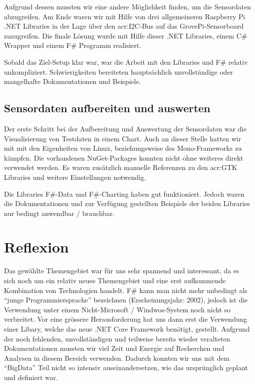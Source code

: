 Aufgrund dessen mussten wir eine andere Möglichkeit finden, um die Sensordaten abzugreifen. Am Ende waren wir mit Hilfe von drei allgemeineren Raspberry Pi .NET Libraries in der Lage über den \gls{acr:I2C}-Bus auf das GrovePi-Sensorboard zuzugreifen. Die finale Lösung wurde mit Hilfe dieser .NET Libraries, einem C\# Wrapper und einem F\# Programm realisiert.

Sobald das Ziel-Setup klar war, war die Arbeit mit den Libraries und F\# relativ unkompliziert. Schwierigkeiten bereiteten hauptsächlich unvollständige oder mangelhafte Dokumentationen und Beispiele.

\subsection{Sensordaten aufbereiten und auswerten}
Der erste Schritt bei der Aufbereitung und Auswertung der Sensordaten war die Visualisierung von Testdaten in einem Chart. Auch an dieser Stelle hatten wir mit mit den Eigenheiten von Linux, beziehungsweise des Mono-Frameworks zu kämpfen. Die vorhandenen NuGet-Packages konnten nicht ohne weiteres direkt verwendet werden. Es waren zusätzlich manuelle Referenzen zu den \gls{acr:GTK} Libraries und weitere Einstellungen notwendig. 

Die Libraries F\#-Data und F\#-Charting haben gut funktioniert. Jedoch waren die Dokumentationen und zur Verfügung gestellten Beispiele der beiden Libraries nur bedingt anwendbar / brauchbar.


\section{Reflexion}
Das gewählte Themengebiet war für uns sehr spannend und interessant, da es sich noch um ein relativ neues Themengebiet und eine erst aufkommende Kombination von Technologien handelt. F\# kann man nicht mehr unbedingt als "`junge Programmiersprache"' bezeichnen (Erscheinungsjahr: 2002), jedoch ist die Verwendung unter einem Nicht-Microsoft / Windwos-System noch nicht so verbreitet. Vor eine grössere Herausforderung hat uns dann erst die Verwendung einer Libary, welche das neue .NET Core Framework benötigt, gestellt. Aufgrund der noch fehlenden, unvollständigen und teilweise bereits wieder veralteten Dokumentationen mussten wir viel Zeit und Energie auf Recherchen und Analysen in diesem Bereich verwenden. Dadurch konnten wir uns mit dem "`BigData"' Teil nicht so intensiv auseinandersetzen, wie das ursprünglich geplant und definiert war.